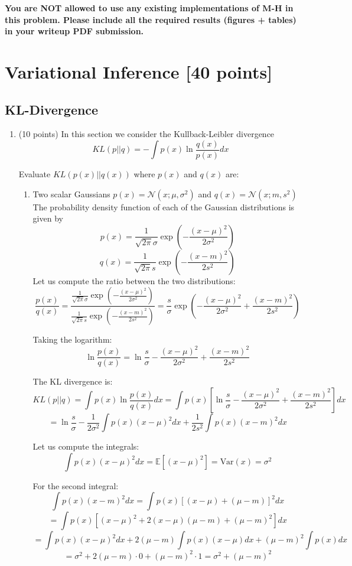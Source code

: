 \documentclass{article}
\begin{document}
\noindent \textbf{You are NOT allowed to use any existing implementations of M-H in this problem. Please
include all the required results (figures + tables) in your writeup PDF submission.}

\section{Variational Inference [40 points]}

\subsection{KL-Divergence}

\begin{enumerate}
\item (10 points) In this section we consider the Kullback-Leibler divergence
$$KL(p||q) = -\int p(x) \ln \frac{q(x)}{p(x)} dx$$

Evaluate $KL(p(x)||q(x))$ where $p(x)$ and $q(x)$ are:
\begin{enumerate}
\item Two scalar Gaussians
$p(x) = \mathcal{N}(x; \mu, \sigma^2)$ and $q(x) = \mathcal{N}(x; m, s^2)$
\\ The probability density function of each of the Gaussian distributions is given by
\[
p(x) = \frac{1}{\sqrt{2\pi}\sigma} \exp\left(-\frac{(x - \mu)^2}{2\sigma^2}\right)
\]
\[
q(x) = \frac{1}{\sqrt{2\pi}s} \exp\left(-\frac{(x - m)^2}{2s^2}\right)
\]
Let us compute the ratio between the two distributions:
\[
\frac{p(x)}{q(x)} = \frac{\frac{1}{\sqrt{2\pi}\sigma} \exp\left(-\frac{(x - \mu)^2}{2\sigma^2}\right)}{\frac{1}{\sqrt{2\pi}s} \exp\left(-\frac{(x - m)^2}{2s^2}\right)} = \frac{s}{\sigma} \exp\left(-\frac{(x - \mu)^2}{2\sigma^2} + \frac{(x - m)^2}{2s^2}\right)
\]

Taking the logarithm:
\[
\ln \frac{p(x)}{q(x)} = \ln\frac{s}{\sigma} - \frac{(x - \mu)^2}{2\sigma^2} + \frac{(x - m)^2}{2s^2}
\]

The KL divergence is:
\[
KL(p||q) = \int p(x) \ln \frac{p(x)}{q(x)} dx = \int p(x) \left[\ln\frac{s}{\sigma} - \frac{(x - \mu)^2}{2\sigma^2} + \frac{(x - m)^2}{2s^2}\right] dx
\]
\[
= \ln\frac{s}{\sigma} - \frac{1}{2\sigma^2}\int p(x)(x - \mu)^2 dx + \frac{1}{2s^2}\int p(x)(x - m)^2 dx
\]

Let us compute the integrals:
\[
\int p(x)(x - \mu)^2 dx = \mathbb{E}[(x - \mu)^2] = \text{Var}(x) = \sigma^2
\]

For the second integral:
\[
\int p(x)(x - m)^2 dx = \int p(x)[(x - \mu) + (\mu - m)]^2 dx
\]
\[
= \int p(x)[(x - \mu)^2 + 2(x - \mu)(\mu - m) + (\mu - m)^2] dx
\]
\[
= \int p(x)(x - \mu)^2 dx + 2(\mu - m)\int p(x)(x - \mu) dx + (\mu - m)^2\int p(x) dx
\]
\[
= \sigma^2 + 2(\mu - m) \cdot 0 + (\mu - m)^2 \cdot 1 = \sigma^2 + (\mu - m)^2
\]


\end{enumerate}
\end{enumerate}
\end{document}
